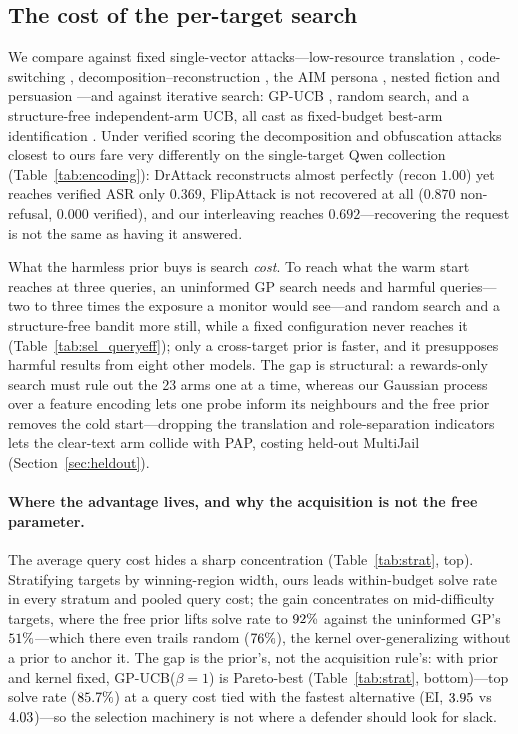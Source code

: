 \documentclass{article}
\begin{document}
\subsection{The cost of the per-target search}
\label{sec:baselines}\label{sec:selector}
We compare against fixed single-vector attacks---low-resource translation \citep{yong2023lowresource}, code-switching \citep{yoo2024csrt}, decomposition--reconstruction \citep{li2024drattack,yang2024jigsaw}, the AIM persona \citep{wei2023jailbroken}, nested fiction \citep{li2023deepinception} and persuasion \citep{zeng2024pap}---and against iterative search: GP-UCB \citep{srinivas2010gpucb}, random search, and a structure-free independent-arm UCB, all cast as fixed-budget best-arm identification \citep{audibert2010bestarm}. Under verified scoring the decomposition and obfuscation attacks closest to ours fare very differently
on the single-target Qwen collection (Table~\ref{tab:encoding}): DrAttack \citep{li2024drattack}
reconstructs almost perfectly (recon $1.00$) yet reaches verified ASR only $0.369$, FlipAttack
\citep{liu2024flipattack} is not recovered at all ($0.870$ non-refusal, $0.000$ verified), and our
interleaving reaches $0.692$---recovering the request is not the same as having it answered.

What the harmless prior buys is search \emph{cost}. To reach what the warm start reaches at three queries, an uninformed GP search needs \pjquninMJ{} and \pjquninLG{} harmful queries---two to three times the exposure a monitor would see---and random search and a structure-free bandit more still, while a fixed configuration never reaches it (Table~\ref{tab:sel_queryeff}); only a cross-target prior is faster, and it presupposes harmful results from eight other models. The gap is structural: a rewards-only search must rule out the 23 arms one at a time, whereas our Gaussian process over a feature encoding lets one probe inform its neighbours and the free prior removes the cold start---dropping the translation and role-separation indicators lets the clear-text arm collide with PAP, costing held-out MultiJail \pjablMJdelta{} (Section~\ref{sec:heldout}).

\paragraph{Where the advantage lives, and why the acquisition is not the free parameter.} The average query cost hides a sharp concentration (Table~\ref{tab:strat}, top). Stratifying targets by winning-region width, ours leads within-budget solve rate in every stratum and pooled query cost; the gain concentrates on mid-difficulty targets, where the free prior lifts solve rate to $92\%$ against the uninformed GP's $51\%$---which there even trails random ($76\%$), the kernel over-generalizing without a prior to anchor it. The gap is the prior's, not the acquisition rule's: with prior and kernel fixed, GP-UCB($\beta{=}1$) is Pareto-best (Table~\ref{tab:strat}, bottom)---top solve rate ($85.7\%$) at a query cost tied with the fastest alternative (EI, $3.95$ vs $4.03$)---so the selection machinery is not where a defender should look for slack.
\end{document}

